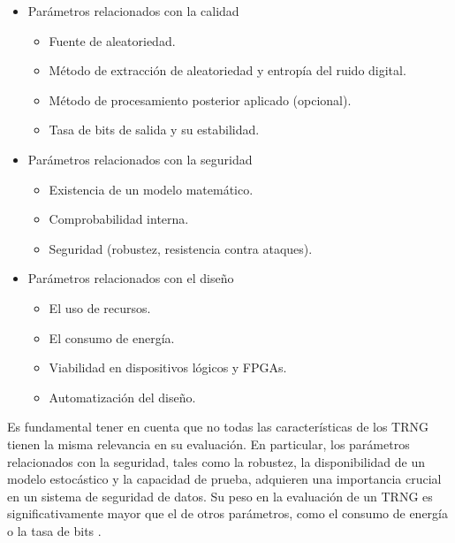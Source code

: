         \begin{itemize}[noitemsep]
            \item Parámetros relacionados con la calidad
                \begin{itemize}[noitemsep]
                    \item Fuente de aleatoriedad.
                    \item Método de extracción de aleatoriedad y entropía del ruido digital.
                    \item Método de procesamiento posterior aplicado (opcional).
                    \item Tasa de bits de salida y su estabilidad.
                \end{itemize}
            \item Parámetros relacionados con la seguridad
                \begin{itemize}[noitemsep]
                    \item Existencia de un modelo matemático.
                    \item Comprobabilidad interna.
                    \item Seguridad (robustez, resistencia contra ataques).
                \end{itemize}
            \item Parámetros relacionados con el diseño
                \begin{itemize}[noitemsep]
                    \item El uso de recursos.
                    \item El consumo de energía.
                    \item Viabilidad en dispositivos lógicos y FPGAs.
                    \item Automatización del diseño.
                \end{itemize}
        \end{itemize}

        Es fundamental tener en cuenta que no todas las características de los TRNG tienen la misma relevancia en su evaluación. En particular, los parámetros relacionados con la seguridad, tales como la robustez, la disponibilidad de un modelo estocástico y la capacidad de prueba, adquieren una importancia crucial en un sistema de seguridad de datos. Su peso en la evaluación de un TRNG es significativamente mayor que el de otros parámetros, como el consumo de energía o la tasa de bits \cite{Badrignans2011}.

